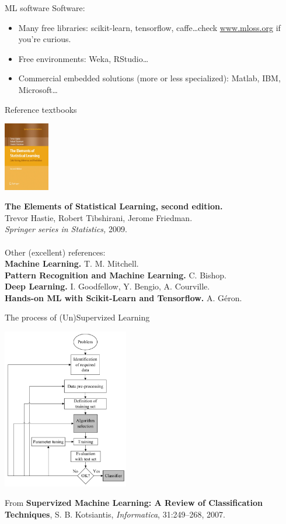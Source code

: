 \documentclass{beamer}
\begin{document}
\begin{frame}{ML software}
Software:
\begin{itemize}
\item Many free libraries: scikit-learn, tensorflow, caffe\ldots check \url{www.mloss.org} if you're curious.
\item Free environments: Weka, RStudio\ldots
\item Commercial embedded solutions (more or less specialized): Matlab, IBM, Microsoft\ldots
\end{itemize}
\end{frame}

\begin{frame}{Reference textbooks}
\begin{center}
\includegraphics[height=3cm]{img/book.jpg}
\end{center}
\textbf{The Elements of Statistical Learning, second edition.}\\
Trevor Hastie, Robert Tibshirani, Jerome Friedman.\\
\textit{Springer series in Statistics,} 2009.\\
~\\
Other (excellent) references:\\
\textbf{Machine Learning.} T. M. Mitchell.\\
\textbf{Pattern Recognition and Machine Learning.} C. Bishop.\\
\textbf{Deep Learning.} I. Goodfellow, Y. Bengio, A. Courville.\\
\textbf{Hands-on ML with Scikit-Learn and Tensorflow.} A. Géron.
\end{frame}

\begin{frame}{The process of (Un)Supervized Learning}
\begin{center}
\includegraphics[height=7cm]{img/process.png}
\end{center}
\vspace{-0.5cm}
{\footnotesize From \textbf{Supervized Machine Learning: A Review of Classification Techniques}, S. B. Kotsiantis, \textit{Informatica}, 31:249--268, 2007.}
\end{frame}
\end{document}
